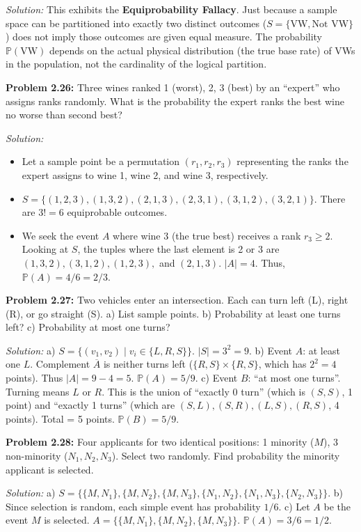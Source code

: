 \documentclass[11pt]{article}
\newcommand{\prob}[1]{\vspace{4mm}\noindent\textbf{Problem #1:}}
\newcommand{\sol}{\vspace{2mm}\noindent\textit{Solution: }}
\begin{document}
\sol 
This exhibits the \textbf{Equiprobability Fallacy}. Just because a sample space can be partitioned into exactly two distinct outcomes ($S = \{\text{VW}, \text{Not VW}\}$) does not imply those outcomes are given equal measure. The probability $\mathbb{P}(\text{VW})$ depends on the actual physical distribution (the true base rate) of VWs in the population, not the cardinality of the logical partition.

\prob{2.26}
Three wines ranked 1 (worst), 2, 3 (best) by an ``expert'' who assigns ranks randomly. What is the probability the expert ranks the best wine no worse than second best?

\sol 
\begin{itemize}
    \item[\textbf{a)}] Let a sample point be a permutation $(r_1, r_2, r_3)$ representing the ranks the expert assigns to wine 1, wine 2, and wine 3, respectively.
    \item[\textbf{b)}] $S = \{(1,2,3), (1,3,2), (2,1,3), (2,3,1), (3,1,2), (3,2,1)\}$. There are $3! = 6$ equiprobable outcomes.
    \item[\textbf{c)}] We seek the event $A$ where wine 3 (the true best) receives a rank $r_3 \ge 2$. Looking at $S$, the tuples where the last element is 2 or 3 are $(1,3,2), (3,1,2), (1,2,3),$ and $(2,1,3)$. 
    $|A| = 4$. Thus, $\mathbb{P}(A) = 4/6 = 2/3$.
\end{itemize}

\prob{2.27}
Two vehicles enter an intersection. Each can turn left (L), right (R), or go straight (S).
a) List sample points. b) Probability at least one turns left? c) Probability at most one turns?

\sol 
a) $S = \{(v_1, v_2) \mid v_i \in \{L, R, S\}\}$. $|S| = 3^2 = 9$.
b) Event $A$: at least one $L$. Complement $\overline{A}$ is neither turns left ($\{R, S\} \times \{R, S\}$, which has $2^2 = 4$ points). Thus $|A| = 9 - 4 = 5$. $\mathbb{P}(A) = 5/9$.
c) Event $B$: ``at most one turns''. Turning means $L$ or $R$. This is the union of ``exactly 0 turn'' (which is $(S, S)$, 1 point) and ``exactly 1 turns'' (which are $(S, L), (S, R), (L, S), (R, S)$, 4 points). Total = 5 points. $\mathbb{P}(B) = 5/9$.

\prob{2.28}
Four applicants for two identical positions: 1 minority ($M$), 3 non-minority ($N_1, N_2, N_3$). Select two randomly. Find probability the minority applicant is selected.

\sol 
a) $S = \{\{M, N_1\}, \{M, N_2\}, \{M, N_3\}, \{N_1, N_2\}, \{N_1, N_3\}, \{N_2, N_3\}\}$.
b) Since selection is random, each simple event has probability $1/6$.
c) Let $A$ be the event $M$ is selected. $A = \{\{M, N_1\}, \{M, N_2\}, \{M, N_3\}\}$. $\mathbb{P}(A) = 3/6 = 1/2$.
\end{document}
